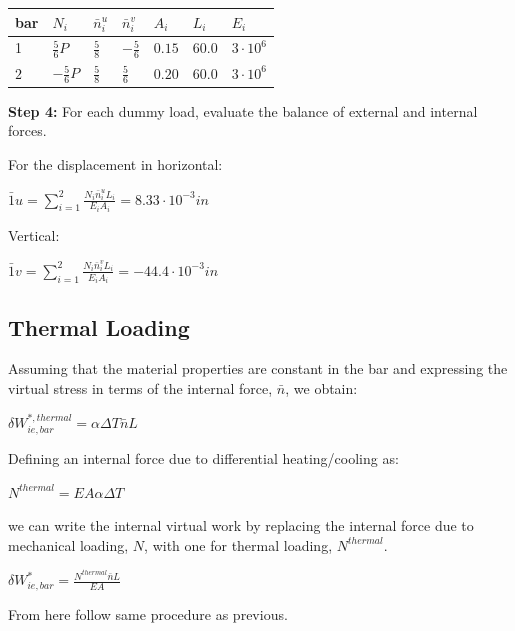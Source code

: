 \documentclass{article}
\begin{document}
\begin{multicols*}{2}
    \begin{center}
        \begin{tabular}{l|llllll}
            bar & $N_i$ & $\bar{n}_i^u$ & $\bar{n}_i^v$ & $A_i$ & $L_i$ & $E_i$ \\
            \hline
            1 & $\frac{5}{6}P$ & $\frac{5}{8}$ & $-\frac{5}{6}$ & $0.15$ & $60.0$ & $3\cdot 10^6$ \\
            $2$ & $-\frac{5}{6}P$ & $\frac{5}{8}$ & $\frac{5}{6}$ & $0.20$ & $60.0$ & $3\cdot 10^6$ \\
        \end{tabular}
    \end{center}

   \textbf{Step 4:} For each dummy load, evaluate the balance of external and 
   internal forces. \par 
   For the displacement in horizontal:\par 
   $\bar{1}u = \sum\limits_{i=1}^2 \frac{N_i\bar{n}_i^uL_i}{E_iA_i} = 8.33 \cdot 10^{-3} in$ \par 
   Vertical: \par 
   $\bar{1}v = \sum\limits_{i=1}^2 \frac{N_i\bar{n}_i^vL_i}{E_iA_i} = -44.4 \cdot 10^{-3} in$ \par

    \subsection*{Thermal Loading}
    Assuming that the material properties are constant in the bar and expressing
    the virtual stress in terms of the internal force, $\bar{n}$, we obtain:\par
    $\delta W_{ie,bar}^{*,thermal}=\alpha \Delta T \bar{n} L$\par 
    Defining an internal force due to differential heating/cooling as:\par
    $N^{thermal} = EA\alpha \Delta T$\par 
    we can write the internal virtual work by replacing the internal force due to
    mechanical loading, $N$, with one for thermal loading, $N^{thermal}$.\par 
    $\delta W_{ie,bar}^* = \frac{N^{thermal}\bar{n}L}{EA}$\par 
    From here follow same procedure as previous.


\end{multicols*}
\end{document}
